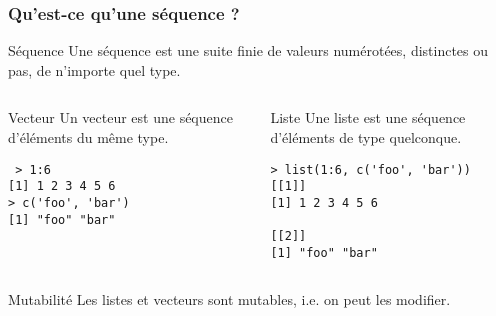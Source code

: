 \begin{frame}[fragile]
  \frametitle{Qu'est-ce qu'une séquence ?}

  \begin{alertblock}{Séquence}
    Une séquence est une suite finie de valeurs numérotées, distinctes ou pas, de n'importe quel type.   
  \end{alertblock}

 
\begin{columns}[t]
\begin{column}{0.48\textwidth}
 \begin{block}{Vecteur}
    Un vecteur est une séquence d'éléments \alert{du même type}.
    \begin{lstlisting}
 > 1:6
[1] 1 2 3 4 5 6
> c('foo', 'bar')
[1] "foo" "bar"     
    \end{lstlisting}
  \end{block}
\end{column}
\begin{column}{0.48\textwidth}
   \begin{block}{Liste}
     Une liste est une séquence d'éléments \alert{de type quelconque}.
     \begin{lstlisting}
> list(1:6, c('foo', 'bar'))
[[1]]
[1] 1 2 3 4 5 6

[[2]]
[1] "foo" "bar"       
     \end{lstlisting}
  \end{block}
\end{column}
\end{columns}

  \begin{block}{Mutabilité}
    Les listes et vecteurs sont mutables, i.e. on peut les modifier.    
  \end{block}
\end{frame}
